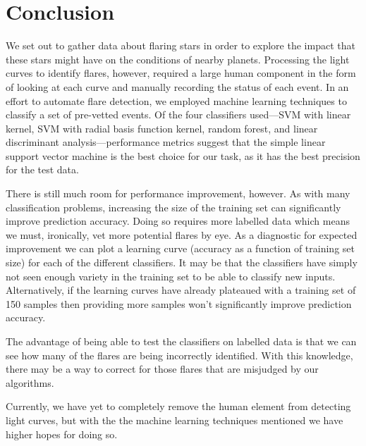 \documentclass[11pt]{article}
\begin{document}
\section{Conclusion}
\label{sec:conc}
We set out to gather data about flaring stars in order to explore the
impact that these stars might have on the conditions of nearby
planets.  Processing the light curves to identify flares, however,
required a large human component in the form of looking at each curve
and manually recording the status of each event.  In an effort to
automate flare detection, we employed machine learning techniques to
classify a set of pre-vetted events.  Of the four classifiers
used---SVM with linear kernel, SVM with radial basis function kernel,
random forest, and linear discriminant analysis---performance metrics
suggest that the simple linear support vector machine is the best
choice for our task, as it has the best precision for the test data.

There is still much room for performance improvement, however.  As
with many classification problems, increasing the size of the training
set can significantly improve prediction accuracy.  Doing so requires
more labelled data which means we must, ironically, vet more potential
flares by eye.  As a diagnostic for expected improvement we can plot a
learning curve (accuracy as a function of training set size) for each
of the different classifiers.  It may be that the classifiers have
simply not seen enough variety in the training set to be able to
classify new inputs. Alternatively, if the learning curves have
already plateaued with a training set of 150 samples then providing
more samples won't significantly improve prediction accuracy.

The advantage of being able to test the classifiers on labelled data
is that we can see how many of the flares are being incorrectly
identified.  With this knowledge, there may be a way to correct for
those flares that are misjudged by our algorithms.

Currently, we have yet to completely remove the human element from
detecting light curves, but with the the machine learning techniques
mentioned we have higher hopes for doing so.
\end{document}
